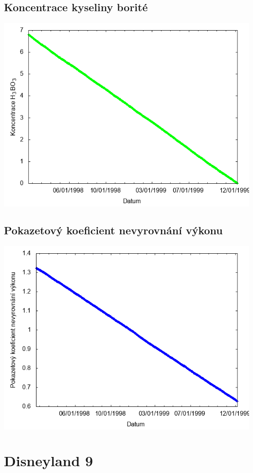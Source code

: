 \documentclass[a4paper,twoside,11pt]{article}
\begin{document}
\subsection*{Koncentrace kyseliny borité}
\begin{center}
\includegraphics[width=.8\textwidth]{graphs/Disneyland_08_bc.png}
\end{center}

\subsection*{Pokazetový koeficient nevyrovnání výkonu}
\begin{center}
\includegraphics[width=.8\textwidth]{graphs/Disneyland_08_fha.png}
\end{center}

\newpage
\section*{Disneyland 9}
\end{document}
